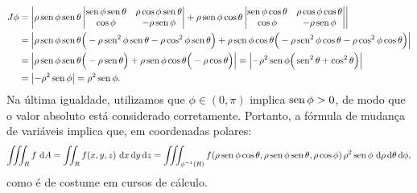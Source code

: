 \documentclass[../livro.tex]{subfiles}  %
\begin{document}
\begin{equation}
\begin{split}
J\phi & = \left| \rho \operatorname{sen} \phi \operatorname{sen} \theta
\left| 
\begin{matrix}
\operatorname{sen} \phi \operatorname{sen} \theta     & \rho \cos \phi \operatorname{sen} \theta  \\
\cos \phi                 &    -\rho \operatorname{sen} \phi  \\
\end{matrix}
\right| + \rho \operatorname{sen} \phi \cos \theta
\left| 
\begin{matrix}
\operatorname{sen} \phi \cos \theta      & \rho \cos \phi \cos \theta \\
\cos \phi                  &    -\rho \operatorname{sen} \phi  \\
\end{matrix}
\right| \right|  \\
& = \left| \rho \operatorname{sen} \phi \operatorname{sen} \theta \Big(- \rho \operatorname{sen}^2 \phi \operatorname{sen} \theta - \rho \cos^2 \phi \operatorname{sen} \theta \Big)  + \rho \operatorname{sen} \phi \cos \theta \Big(- \rho \operatorname{sen}^2 \phi \cos \theta - \rho \cos^2 \phi \cos \theta \Big) \right|  \\
& =  \left| \rho \operatorname{sen} \phi \operatorname{sen} \theta \Big (- \rho \operatorname{sen} \theta \Big) + \rho \operatorname{sen} \phi \cos \theta \Big(- \rho \cos \theta \Big) \right|  = \left|  - \rho^2 \operatorname{sen} \phi \Big( \operatorname{sen}^2 \theta + \cos^2 \theta \Big) \right| \\
& = \left| - \rho^2 \operatorname{sen} \phi \right| = \rho^2 \operatorname{sen} \phi.
\end{split}
\end{equation}
Na última igualdade, utilizamos que $\phi \in (0,\pi)$ implica $\operatorname{sen} \phi > 0$, de modo que o valor absoluto está considerado corretamente. Portanto, a fórmula de mudança de variáveis implica que, em coordenadas polares:
\begin{equation}
\iiint_R f \, \, \mathrm{d} A = \iint_R f(x,y, z) \, \, \mathrm{d} x \, \mathrm{d} y \, \mathrm{d} z = \iiint_{\phi^{-1}(R)} f(\rho \operatorname{sen} \phi \cos \theta, \rho \operatorname{sen} \phi \operatorname{sen} \theta, \rho \cos \phi) \, \rho^2 \operatorname{sen} \phi \, \, \mathrm{d} \rho \, \mathrm{d} \theta \, \mathrm{d} \phi,
\end{equation} como é de costume em cursos de cálculo.
\end{document}
